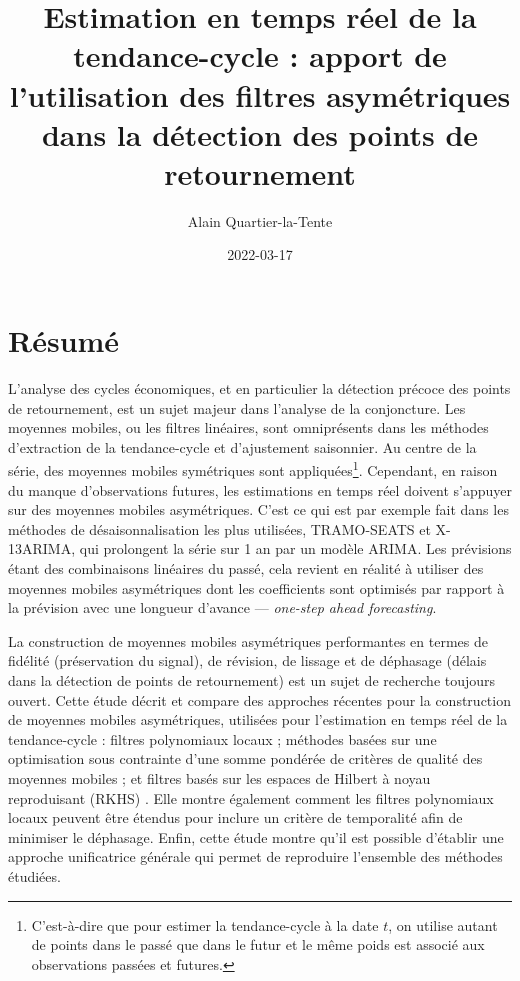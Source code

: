 \documentclass[
  12pt,
  french,
  12pt,a4paper]{article}
\title{Estimation en temps réel de la tendance-cycle : apport de l'utilisation des filtres asymétriques dans la détection des points de retournement}
\author{Alain Quartier-la-Tente}
\date{2022-03-17}
\newcommand\1{\mathds{1}}
\begin{document}
\maketitle

\thispagestyle{fancy}

\hypertarget{ruxe9sumuxe9}{%
\section*{Résumé}\label{ruxe9sumuxe9}}

L'analyse des cycles économiques, et en particulier la détection précoce
des points de retournement, est un sujet majeur dans l'analyse de la
conjoncture. Les moyennes mobiles, ou les filtres linéaires, sont
omniprésents dans les méthodes d'extraction de la tendance-cycle et
d'ajustement saisonnier. Au centre de la série, des moyennes mobiles
symétriques sont appliquées\footnote{ C'est-à-dire que pour estimer la
  tendance-cycle à la date \(t\), on utilise autant de points dans le
  passé que dans le futur et le même poids est associé aux observations
  passées et futures.}. Cependant, en raison du manque d'observations
futures, les estimations en temps réel doivent s'appuyer sur des
moyennes mobiles asymétriques. C'est ce qui est par exemple fait dans
les méthodes de désaisonnalisation les plus utilisées, TRAMO-SEATS et
X-13ARIMA, qui prolongent la série sur 1 an par un modèle ARIMA. Les
prévisions étant des combinaisons linéaires du passé, cela revient en
réalité à utiliser des moyennes mobiles asymétriques dont les
coefficients sont optimisés par rapport à la prévision avec une longueur
d'avance --- \emph{one-step ahead forecasting}.

La construction de moyennes mobiles asymétriques performantes en termes
de fidélité (préservation du signal), de révision, de lissage et de
déphasage (délais dans la détection de points de retournement) est un
sujet de recherche toujours ouvert. Cette étude décrit et compare des
approches récentes pour la construction de moyennes mobiles
asymétriques, utilisées pour l'estimation en temps réel de la
tendance-cycle : filtres polynomiaux locaux
\autocite{proietti2008,GrayThomson1996} ; méthodes basées sur une
optimisation sous contrainte d'une somme pondérée de critères de qualité
des moyennes mobiles \autocite{ch15HBSA,trilemmaWMR2019} ; et filtres
basés sur les espaces de Hilbert à noyau reproduisant (RKHS)
\textcite{dagumbianconcini2008}. Elle montre également comment les
filtres polynomiaux locaux peuvent être étendus pour inclure un critère
de temporalité afin de minimiser le déphasage. Enfin, cette étude montre
qu'il est possible d'établir une approche unificatrice générale qui
permet de reproduire l'ensemble des méthodes étudiées.
\end{document}
